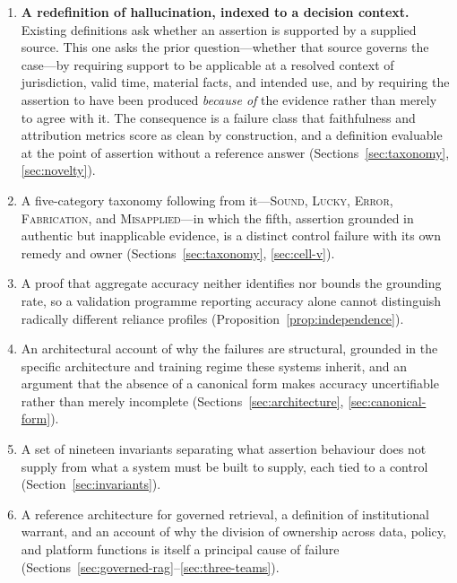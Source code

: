 \documentclass[11pt]{article}
\theoremstyle{plain}
\theoremstyle{definition}
\begin{document}
\begin{enumerate}
  \item \textbf{A redefinition of hallucination, indexed to a decision context.}
        Existing definitions ask whether an assertion is supported by a supplied
        source. This one asks the prior question---whether that source governs the
        case---by requiring support to be applicable at a resolved context of
        jurisdiction, valid time, material facts, and intended use, and by
        requiring the assertion to have been produced \emph{because of} the evidence
        rather than merely to agree with it. The consequence is a failure class that
        faithfulness and attribution metrics score as clean by construction, and a
        definition evaluable at the point of assertion without a reference answer
        (Sections~\ref{sec:taxonomy}, \ref{sec:novelty}).
  \item A five-category taxonomy following from it---\textsc{Sound},
        \textsc{Lucky}, \textsc{Error}, \textsc{Fabrication}, and
        \textsc{Misapplied}---in which the fifth, assertion grounded in authentic
        but inapplicable evidence, is a distinct control failure with its own
        remedy and owner (Sections~\ref{sec:taxonomy}, \ref{sec:cell-v}).
  \item A proof that aggregate accuracy neither identifies nor bounds the grounding
        rate, so a validation programme reporting accuracy alone cannot distinguish
        radically different reliance profiles
        (Proposition~\ref{prop:independence}).
  \item An architectural account of why the failures are structural, grounded in the
        specific architecture and training regime these systems inherit, and an
        argument that the absence of a canonical form makes accuracy uncertifiable
        rather than merely incomplete
        (Sections~\ref{sec:architecture}, \ref{sec:canonical-form}).
  \item A set of nineteen invariants separating what assertion behaviour does not
        supply from what a system must be built to supply, each tied to a control
        (Section~\ref{sec:invariants}).
  \item A reference architecture for governed retrieval, a definition of
        institutional warrant, and an account of why the division of ownership
        across data, policy, and platform functions is itself a principal cause of
        failure (Sections~\ref{sec:governed-rag}--\ref{sec:three-teams}).
\end{enumerate}
\end{document}
